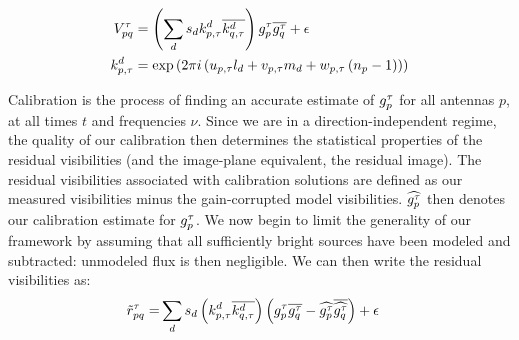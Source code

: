 \begin{align} %
V_{pq}^{\tnuIndeix} &= \left(\sum_d s_d  k_{p,\tnuIndeix}^d\overline{k_{q,\tnuIndeix}^d}\right) g_p^{\tnuIndeix}\overline{g_{q}^{\tnuIndeix}}+\epsilon\\
k_{p,\tnuIndeix}^d  &= \exp\left(2\pi i \left(u_{p,\tnuIndeix} l_d + v_{p,\tnuIndeix} m_d + w_{p,\tnuIndeix} \left(n_p-1\right)\right)\right)\label{eq.fourier.kernel}
\end{align}

\pg
Calibration is the process of finding an accurate estimate of $g_p^{\tau}$ for all antennas $p$, at all times $t$ and frequencies $\nu$. Since we are in a direction-independent regime, the quality of our calibration then determines the statistical properties of the residual visibilities (and the image-plane equivalent, the residual image). The residual visibilities associated with calibration solutions are defined as our measured visibilities minus the gain-corrupted model visibilities.
$\widehat{g_p^{\tau}}$ then denotes our calibration estimate for $g_p^{\tau}$. We now begin to limit the generality of our framework by assuming that all sufficiently bright sources have been modeled and subtracted: unmodeled flux is then negligible. We can then write the residual visibilities as:
\begin{align}
\tilde{r}_{pq}^\tau =& \sum_{d} s_{d} \left( k_{p,\tau}^{d} \overline{k_{q,\tau}^{d}}\right) \left(g_p^{\tau} \overline{g_q^{\tau}} - \widehat{g_p^{\tau}} \overline{\widehat{g_q^{\tau}}}\right)  + \epsilon  \label{eq.residual.scalar}
\end{align}

